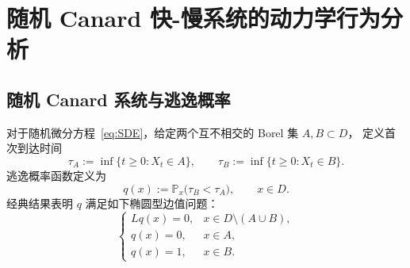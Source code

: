 %
%	
%	
%	
%	
%	
%	

\section{随机 Canard 快-慢系统的动力学行为分析}
\label{sec:canard-dynamics}

\subsection{随机 Canard 系统与逃逸概率}

对于随机微分方程~\eqref{eq:SDE}，给定两个互不相交的 Borel 集 $A,B\subset D$，
定义首次到达时间
\[
\tau_A := \inf\{t\ge0 : X_t\in A\},\qquad
\tau_B := \inf\{t\ge0 : X_t\in B\}.
\]
逃逸概率函数定义为
\[
q(x) := \mathbb{P}_x\bigl(\tau_B < \tau_A\bigr),\qquad x\in D.
\]
经典结果表明 $q$ 满足如下椭圆型边值问题\cite{EV_TPT,EV_TowardsTP}：
\begin{equation}\label{eq:committor_PDE_ch4}
	\begin{cases}
		L q(x) = 0, & x\in D\setminus(A\cup B),\\[1mm]
		q(x) = 0, & x\in A,\\[1mm]
		q(x) = 1, & x\in B.
	\end{cases}
\end{equation}

